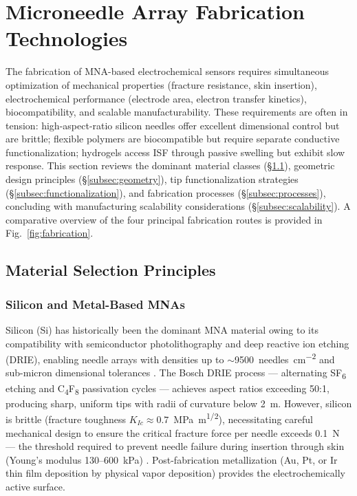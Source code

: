 \documentclass[review,1p]{elsarticle}
\begin{document}
\section{Microneedle Array Fabrication Technologies}
\label{sec:fabrication}

The fabrication of MNA-based electrochemical sensors requires simultaneous optimization of mechanical properties (fracture resistance, skin insertion), electrochemical performance (electrode area, electron transfer kinetics), biocompatibility, and scalable manufacturability. These requirements are often in tension: high-aspect-ratio silicon needles offer excellent dimensional control but are brittle; flexible polymers are biocompatible but require separate conductive functionalization; hydrogels access ISF through passive swelling but exhibit slow response. This section reviews the dominant material classes (\S\ref{subsec:materials}), geometric design principles (\S\ref{subsec:geometry}), tip functionalization strategies (\S\ref{subsec:functionalization}), and fabrication processes (\S\ref{subsec:processes}), concluding with manufacturing scalability considerations (\S\ref{subsec:scalability}). A comparative overview of the four principal fabrication routes is provided in Fig.~\ref{fig:fabrication}.

\subsection{Material Selection Principles}
\label{subsec:materials}

\subsubsection{Silicon and Metal-Based MNAs}

Silicon (Si) has historically been the dominant MNA material owing to its compatibility with semiconductor photolithography and deep reactive ion etching (DRIE), enabling needle arrays with densities up to $\sim$9500~needles~cm\textsuperscript{$-2$} and sub-micron dimensional tolerances \cite{Dervisevic2021}. The Bosch DRIE process — alternating SF\textsubscript{6} etching and C\textsubscript{4}F\textsubscript{8} passivation cycles — achieves aspect ratios exceeding 50:1, producing sharp, uniform tips with radii of curvature below 2~\textmu{}m. However, silicon is brittle (fracture toughness $K_{Ic} \approx 0.7$~MPa~m\textsuperscript{1/2}), necessitating careful mechanical design to ensure the critical fracture force per needle exceeds 0.1~N — the threshold required to prevent needle failure during insertion through skin (Young's modulus 130--600~kPa) \cite{Yan2023Fracture}. Post-fabrication metallization (Au, Pt, or Ir thin film deposition by physical vapor deposition) provides the electrochemically active surface.
\end{document}
